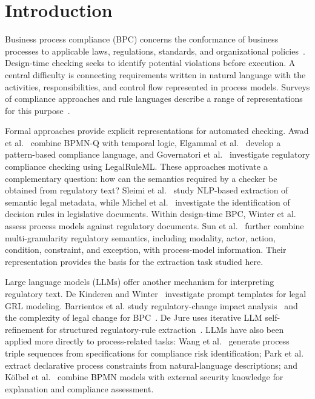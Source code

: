 \section{Introduction}
\label{sec:1}

Business process compliance (BPC) concerns the conformance of business processes to applicable laws, regulations, standards, and organizational policies~\cite{hashmi2018we}. Design-time checking seeks to identify potential violations before execution. A central difficulty is connecting requirements written in natural language with the activities, responsibilities, and control flow represented in process models. Surveys of compliance approaches and rule languages describe a range of representations for this purpose~\cite{hashmi2018we,zasada2023evaluation}.

Formal approaches provide explicit representations for automated checking. Awad et al.~\cite{awad2008efficient} combine BPMN-Q with temporal logic, Elgammal et al.~\cite{elgammal2016formalizing} develop a pattern-based compliance language, and Governatori et al.~\cite{governatori2016semantic} investigate regulatory compliance checking using LegalRuleML. These approaches motivate a complementary question: how can the semantics required by a checker be obtained from regulatory text? Sleimi et al.~\cite{sleimi2018automated} study NLP-based extraction of semantic legal metadata, while Michel et al.~\cite{michel2022identification} investigate the identification of decision rules in legislative documents. Within design-time BPC, Winter et al.~\cite{winter2020assessing} assess process models against regulatory documents. Sun et al.~\cite{sun2024design} further combine multi-granularity regulatory semantics, including modality, actor, action, condition, constraint, and exception, with process-model information. Their representation provides the basis for the extraction task studied here.

Large language models (LLMs) offer another mechanism for interpreting regulatory text. De Kinderen and Winter~\cite{de2024towards} investigate prompt templates for legal GRL modeling. Barrientos et al. study regulatory-change impact analysis~\cite{barrientos2026impact} and the complexity of legal change for BPC~\cite{barrientos2026taming}. De Jure uses iterative LLM self-refinement for structured regulatory-rule extraction~\cite{guliani2026dejure}. LLMs have also been applied more directly to process-related tasks: Wang et al.~\cite{wang2025leveraging} generate process triple sequences from specifications for compliance risk identification; Park et al.~\cite{park2026extracting} extract declarative process constraints from natural-language descriptions; and K\"olbel et al.~\cite{koelbel2026context} combine BPMN models with external security knowledge for explanation and compliance assessment.


